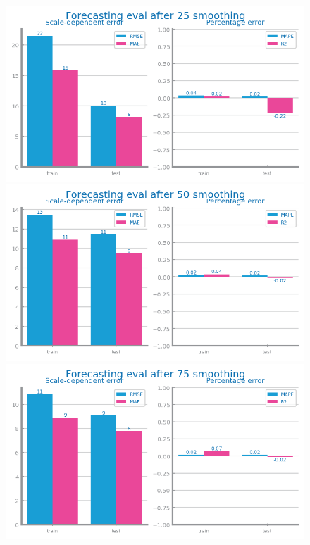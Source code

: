 \documentclass[10pt]{extarticle}
\begin{document}
\begin{figure}[H]
\centering\includegraphics[scale=0.5]{images/dataset2/time_series/fts_forecast_eval_after_smooth_ws_25.png}
\includegraphics[scale=0.5]{images/dataset2/time_series/fts_forecast_eval_after_smooth_ws_50.png}
\includegraphics[scale=0.5]{images/dataset2/time_series/fts_forecast_eval_after_smooth_ws_75.png}

\end{figure}
\end{document}
